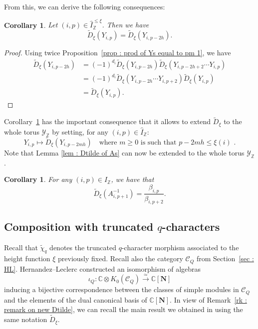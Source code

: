 \documentclass[12pt]{amsart}
\theoremstyle{plain}
\newtheorem{corollary}[theorem]{Corollary}
\theoremstyle{definition}
\numberwithin{equation}{section}
\newcommand{\tchi}{{\widetilde{\chi}}}
\newcommand{\IZ}{\widehat{I}_{\mathbb{Z}}}
\newcommand{\IxiZ}{\widehat{I}_{\mathbb{Z}}^{ \leq \xi}}
\newcommand{\YZ}{\mathcal{Y}_{\mathbb{Z}}}
\newcommand{\tdxi}{\widetilde{D}_{\xi}}
\newcommand{\CN}{\mathbb{C}[\mathbf{N}]}
\newcommand{\CQ}{\mathcal{C}_Q}
\begin{document}
  From this, we can derive the following consequences:

   \begin{corollary} \label{coro : periodicity of Ys}
       Let $(i,p) \in \IxiZ$. Then we have 
       $$ \tdxi(Y_{i,p}) = \tdxi (Y_{i,p-2h}) . $$
   \end{corollary}

    \begin{proof}
 Using twice Proposition~\ref{prop : prod of Ys equal to pm 1}, we have 
 \begin{align*}
     \tdxi(Y_{i,p-2h}) &= (-1)^{d_i} \tdxi (Y_{i,p-2h}) \tdxi(Y_{i,p-2h+2} \cdots Y_{i,p}) \\
     &= (-1)^{d_i} \tdxi (Y_{i,p-2h} \cdots Y_{i,p+2}) \tdxi (Y_{i,p}) \\
     &= \tdxi (Y_{i,p}) .
 \end{align*}
    \end{proof}

  Corollary~\ref{coro : periodicity of Ys} has the important consequence that it allows to extend $\tdxi$ to the whole torus $\YZ$ by setting, for any $(i,p) \in \IZ$:
  $$ Y_{i,p} \longmapsto \tdxi(Y_{i,p-2mh}) \quad \text{where $m \geq 0$ is such that $p-2mh \leq \xi(i)$ .}  $$
  Note that Lemma \ref{lem : Dtilde of As} can now be extended to the whole torus $\YZ$. 

   \begin{corollary} \label{coro : Dtilde of A inverse}
    For any $(i,p) \in \IZ$, we have that 
    $$ \tdxi(A_{i,p+1}^{-1}) = \frac{\beta_{i,p}}{\beta_{i,p+2}} . $$
   \end{corollary}

\subsection{Composition with truncated \texorpdfstring{$q$-characters}{q-characters}} \label{sec : Dtilde with truncated q-char}

 Recall that $\tchi_q$ denotes the truncated $q$-character morphism associated to the height function $\xi$ previously fixed.
Recall also the category $\CQ$ from Section~\ref{sec : HL}. 
Hernandez--Leclerc \cite{HL15} constructed an isomorphism of algebras 
$$ \iota_Q : \mathbb{C} \otimes K_0(\CQ) \xrightarrow{\simeq} \CN $$
inducing a bijective correspondence between the classes of simple modules in $\CQ$ and the elements of the dual canonical basis of $\CN$. In view of Remark~\ref{rk : remark on new Dtilde}, we can recall the main result we obtained in  \cite{CasbiLi} using the same notation $\tdxi$.
\end{document}
